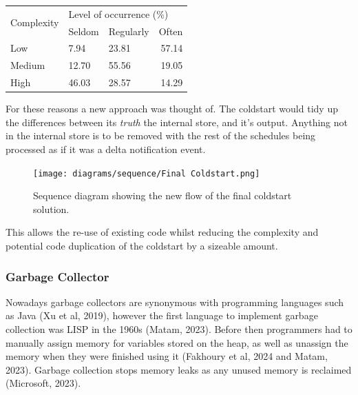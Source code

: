 \begin{table}[H]
  \centering
  \begin{tabular}{|l|llr|}
  \hline
  \multicolumn{1}{|c|}{\multirow{2}{*}{Complexity}} & \multicolumn{3}{l|}{Level of occurrence (\%)}                        \\ \cline{2-4} 
  \multicolumn{1}{|c|}{}                            & \multicolumn{1}{l|}{Seldom} & \multicolumn{1}{l|}{Regularly} & Often \\ \hline
  Low                                               & \multicolumn{1}{l|}{7.94}   & \multicolumn{1}{l|}{23.81}     & 57.14 \\ \hline
  Medium                                            & \multicolumn{1}{l|}{12.70}  & \multicolumn{1}{l|}{55.56}     & 19.05 \\ \hline
  High                                              & \multicolumn{1}{l|}{46.03}  & \multicolumn{1}{l|}{28.57}     & 14.29 \\ \hline
  \end{tabular}
  \end{table}

  For these reasons a new approach was thought of. The coldstart would tidy up the differences between its \textit{truth} the internal store, and 
  it's output. Anything not in the internal store is to be removed with the rest of the schedules being processed as if it was a delta notification 
  event.

  \begin{figure}[H]
    \centering
    \texttt{[image: diagrams/sequence/Final Coldstart.png]}
    \caption{Sequence diagram showing the new flow of the final coldstart solution.}
    \label{fig:finalColdstart}
  \end{figure}

  This allows the re-use of existing code whilst reducing the complexity and potential code duplication of the coldstart by a sizeable amount.

  \newpage
  \subsubsection{Garbage Collector}
  Nowadays garbage collectors are synonymous with programming languages such as Java (Xu et al, 2019), however the first language to implement garbage 
  collection was LISP in the 1960s (Matam, 2023). Before then programmers had to manually assign memory for variables stored on the heap, as well as 
  unassign the memory when they were finished using it (Fakhoury et al, 2024 and Matam, 2023). 
  Garbage collection stops memory leaks as any unused memory is reclaimed (Microsoft, 2023).

